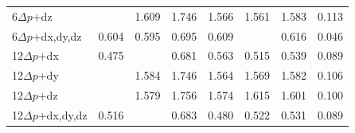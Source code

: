 \begin{table}[htbp]
\begin{tabular}{l|ccccc|cc}
        6$\Delta p$+dz & \cellcolor{gray!20}{1.431} & 1.609 & 1.746 & 1.566 & 1.561 & 1.583 & 0.113 \\
        6$\Delta p$+dx,dy,dz & 0.604 & 0.595 & 0.695 & 0.609 & \cellcolor{gray!20}{0.577} & 0.616 & 0.046 \\
        12$\Delta p$+dx & 0.475 & \cellcolor{gray!20}{0.459} & 0.681 & 0.563 & 0.515 & 0.539 & 0.089 \\
        12$\Delta p$+dy & \cellcolor{gray!20}{1.448} & 1.584 & 1.746 & 1.564 & 1.569 & 1.582 & 0.106 \\
        12$\Delta p$+dz & \cellcolor{gray!20}{1.480} & 1.579 & 1.756 & 1.574 & 1.615 & 1.601 & 0.100 \\
        12$\Delta p$+dx,dy,dz & 0.516 & \cellcolor{gray!20}{0.456} & 0.683 & 0.480 & 0.522 & 0.531 & 0.089 \\
        \hline
        \end{tabular}
        \label{tab:xgb_cv_performance}
        \end{table}
